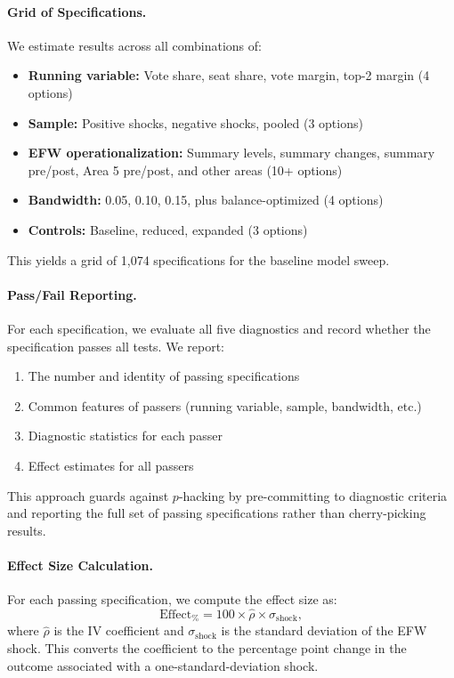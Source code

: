 \documentclass[12pt,a4paper]{article}
\begin{document}
\paragraph{Grid of Specifications.}
We estimate results across all combinations of:
\begin{itemize}[noitemsep]
    \item \textbf{Running variable:} Vote share, seat share, vote margin, 
    top-2 margin (4 options)
    \item \textbf{Sample:} Positive shocks, negative shocks, pooled (3 options)
    \item \textbf{EFW operationalization:} Summary levels, summary changes, 
    summary pre/post, Area 5 pre/post, and other areas (10+ options)
    \item \textbf{Bandwidth:} 0.05, 0.10, 0.15, plus balance-optimized 
    (4 options)
    \item \textbf{Controls:} Baseline, reduced, expanded (3 options)
\end{itemize}

This yields a grid of 1,074 specifications for the baseline model sweep.

\paragraph{Pass/Fail Reporting.}
For each specification, we evaluate all five diagnostics and record 
whether the specification passes all tests. We report:
\begin{enumerate}[noitemsep]
    \item The number and identity of passing specifications
    \item Common features of passers (running variable, sample, bandwidth, etc.)
    \item Diagnostic statistics for each passer
    \item Effect estimates for all passers
\end{enumerate}

This approach guards against $p$-hacking by pre-committing to diagnostic 
criteria and reporting the full set of passing specifications rather 
than cherry-picking results.

\paragraph{Effect Size Calculation.}
For each passing specification, we compute the effect size as:
\begin{equation}
    \text{Effect}_{\%} = 100 \times \hat{\rho} \times \sigma_{\text{shock}},
\end{equation}
where $\hat{\rho}$ is the IV coefficient and $\sigma_{\text{shock}}$ is 
the standard deviation of the EFW shock. This converts the coefficient 
to the percentage point change in the outcome associated with a 
one-standard-deviation shock.
\end{document}
